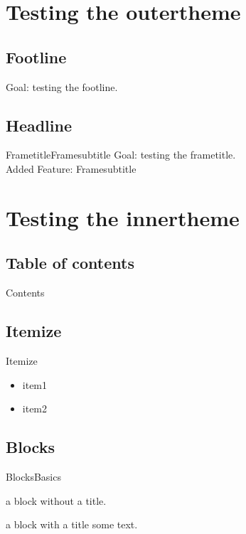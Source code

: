 \documentclass[aspectratio=169, 9pt]{beamer}
\begin{document}

\section{Testing the outertheme}

%
\subsection{Footline}
\begin{frame}
Goal: testing the footline.
\end{frame}
%
\subsection{Headline}
\begin{frame}{Frametitle}{Framesubtitle}
Goal: testing the frametitle.\\
Added Feature: Framesubtitle 
\end{frame}


\section{Testing the innertheme}

%
\subsection{Table of contents}
\begin{frame}{\textcolor{inriaGrey}{Contents}}
\end{frame}
%
\subsection{Itemize}
\begin{frame}{Itemize}
  \begin{itemize}
  \item item1
  \item item2
  \end{itemize}
\end{frame}
%
\subsection{Blocks}
\begin{frame}{Blocks}{Basics}
  \begin{block}{}
    a block without a title.
  \end{block}
  \begin{block}{a block with a title}
    some text.
  \end{block}
\end{frame}
\end{document}
